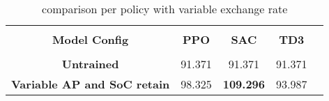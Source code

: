 \begin{large}
\begin{table}
\begin{center}
	\begin{tabular}{ccccc} 
		\hline %
		\vspace{0.5pt} \\
		\textbf{Model Config} & \textbf{PPO} & \textbf{SAC} & \textbf{TD3} \\ %
		\hline %
		\vspace{0.5pt} \\
		\textbf{Untrained} & 91.371 & 91.371  & 91.371 \\
		\textbf{Variable AP and SoC retain} & 98.325 & \textbf{109.296}  & 93.987 \\
		\hline %
	\end{tabular}
	\caption{ comparison per policy with variable exchange rate}
	\label{table:comparison_variable_ap_soc_retain}
	
\end{center}
\end{table}
	
\end{large}
